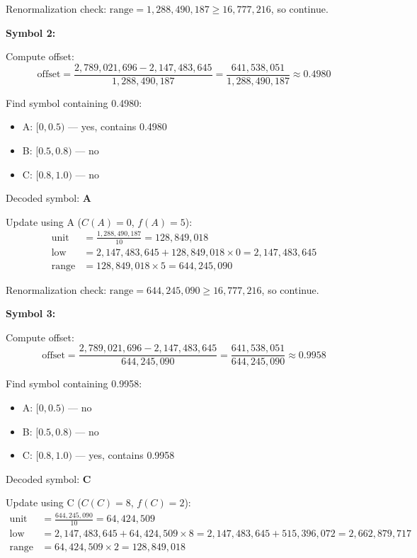 \documentclass[12pt]{article}
\begin{document}
Renormalization check: $\text{range} = 1{,}288{,}490{,}187 \ge 16{,}777{,}216$, so continue.

\vspace{2mm}
\textbf{Symbol 2:}

Compute offset:
\[
\text{offset} = \frac{2{,}789{,}021{,}696 - 2{,}147{,}483{,}645}{1{,}288{,}490{,}187} = \frac{641{,}538{,}051}{1{,}288{,}490{,}187} \approx 0.4980
\]

Find symbol containing 0.4980:
\begin{itemize}
    \item A: $[0, 0.5)$ — yes, contains 0.4980
    \item B: $[0.5, 0.8)$ — no
    \item C: $[0.8, 1.0)$ — no
\end{itemize}

Decoded symbol: \textbf{A}

Update using A ($C(A)=0$, $f(A)=5$):
\begin{align*}
\text{unit} &= \frac{1{,}288{,}490{,}187}{10} = 128{,}849{,}018 \\
\text{low} &= 2{,}147{,}483{,}645 + 128{,}849{,}018 \times 0 = 2{,}147{,}483{,}645 \\
\text{range} &= 128{,}849{,}018 \times 5 = 644{,}245{,}090
\end{align*}

Renormalization check: $\text{range} = 644{,}245{,}090 \ge 16{,}777{,}216$, so continue.

\vspace{2mm}
\textbf{Symbol 3:}

Compute offset:
\[
\text{offset} = \frac{2{,}789{,}021{,}696 - 2{,}147{,}483{,}645}{644{,}245{,}090} = \frac{641{,}538{,}051}{644{,}245{,}090} \approx 0.9958
\]

Find symbol containing 0.9958:
\begin{itemize}
    \item A: $[0, 0.5)$ — no
    \item B: $[0.5, 0.8)$ — no
    \item C: $[0.8, 1.0)$ — yes, contains 0.9958
\end{itemize}

Decoded symbol: \textbf{C}

Update using C ($C(C)=8$, $f(C)=2$):
\begin{align*}
\text{unit} &= \frac{644{,}245{,}090}{10} = 64{,}424{,}509 \\
\text{low} &= 2{,}147{,}483{,}645 + 64{,}424{,}509 \times 8 = 2{,}147{,}483{,}645 + 515{,}396{,}072 = 2{,}662{,}879{,}717 \\
\text{range} &= 64{,}424{,}509 \times 2 = 128{,}849{,}018
\end{align*}
\end{document}
